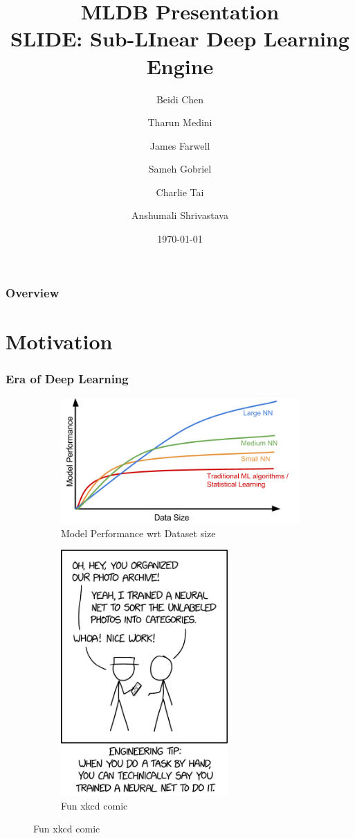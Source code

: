 \documentclass{beamer}
\title[SLIDE]{MLDB Presentation\\SLIDE: Sub-LInear Deep Learning Engine}
\author[Beidi Chen et al.]{Beidi Chen \and Tharun Medini \and James Farwell \and Sameh Gobriel \and Charlie Tai \and Anshumali Shrivastava}
\date{\today}
\begin{document}
\begin{frame}
    \titlepage
\end{frame}

\begin{frame}
    \frametitle{Overview}
    \tableofcontents
\end{frame}


\section{Motivation}
\begin{frame}
    \frametitle{Era of Deep Learning}
    \begin{figure}[ht!]
        \centering
        \begin{subfigure}{0.4\textwidth}
            \centering
            \includegraphics[width=1.2\textwidth]{images/deep learning.png}
            \caption{Model Performance wrt Dataset size}
            \label{fig:deep-learning}
        \end{subfigure}
        \begin{subfigure}{0.4\textwidth}
            \centering
            \includegraphics[width=0.7\textwidth]{images/xkcd.png}
            \caption{Fun xkcd comic}
            \label{fig:deep-learning}
        \end{subfigure}


\end{figure}
\end{frame}
\end{document}
